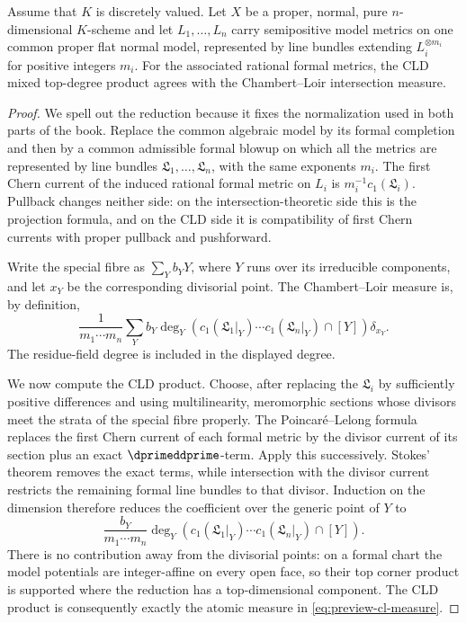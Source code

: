 \begin{proposition}\label{prop:model-core-preview}
Assume that $K$ is discretely valued.  Let $X$ be a proper, normal,
pure $n$-dimensional $K$-scheme and let $L_1,\ldots,L_n$ carry semipositive
model metrics on one common proper flat normal model, represented by line
bundles extending $L_i^{\otimes m_i}$ for positive integers $m_i$.  For the
associated rational formal metrics, the CLD mixed top-degree product agrees
with the Chambert--Loir intersection measure.
\end{proposition}
\begin{proof}
We spell out the reduction because it fixes the normalization used in both
parts of the book.  Replace the common algebraic model by its formal
completion and then by a common admissible formal blowup on which all the
metrics are represented by line bundles
$\mathfrak L_1,\ldots,\mathfrak L_n$, with the same exponents $m_i$.
The first Chern current of the induced rational formal metric on $L_i$ is
$m_i^{-1}c_1(\mathfrak L_i)$.  Pullback changes neither side: on the
intersection-theoretic side this is the projection formula, and on the CLD
side it is compatibility of first Chern currents with proper pullback and
pushforward.

Write the special fibre as $\sum_Y b_Y Y$, where $Y$ runs over its
irreducible components, and let $x_Y$ be the corresponding divisorial point.
The Chambert--Loir measure is, by definition,
\begin{equation}\label{eq:preview-cl-measure}
 \frac{1}{m_1\cdots m_n}\sum_Y b_Y
 \deg_Y\!\left(
   c_1(\mathfrak L_1|_Y)\cdots c_1(\mathfrak L_n|_Y)\cap[Y]
 \right)\delta_{x_Y}.
\end{equation}
The residue-field degree is included in the displayed degree.

We now compute the CLD product.  Choose, after replacing the
$\mathfrak L_i$ by sufficiently positive differences and using
multilinearity, meromorphic sections whose divisors meet the strata of the
special fibre properly.  The Poincar\'e--Lelong formula replaces the first
Chern current of each formal metric by the divisor current of its section
plus an exact $\dprimeddprime$-term.  Apply this successively.  Stokes' theorem
removes the exact terms, while intersection with the divisor current
restricts the remaining formal line bundles to that divisor.  Induction on
the dimension therefore reduces the coefficient over the generic point of
$Y$ to
\[
 \frac{b_Y}{m_1\cdots m_n}\deg_Y\!\left(
   c_1(\mathfrak L_1|_Y)\cdots c_1(\mathfrak L_n|_Y)\cap[Y]
 \right).
\]
There is no contribution away from the divisorial points: on a formal chart
the model potentials are integer-affine on every open face, so their top
corner product is supported where the reduction has a top-dimensional
component.  The CLD product is consequently exactly the atomic measure in
\eqref{eq:preview-cl-measure}.


\end{proof}
